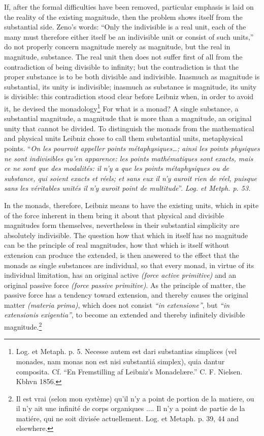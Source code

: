 \documentclass[12pt,a4paper,openany]{book}
\newcommand{\opage}[1]{\marginnote{\footnotesize\textit{[#1]}}}
\begin{document}
\setcounter{footnote}{0}%
\opage{124}If, after the formal difficulties have been
removed, particular emphasis is laid on the reality of the
existing magnitude, then the problem shows itself from the substantial
side. Zeno's words: ``Only the indivisible is a real
unit, each of the many must therefore either itself be
an indivisible unit or consist of such units,''
do not properly concern magnitude merely as magnitude, but the
real in magnitude, substance. The real unit
then does not suffer first of all from the contradiction of being divisible
to infinity; but the contradiction is that the proper substance
is to be both divisible and indivisible. Inasmuch as
magnitude is substantial, its unity is indivisible; inasmuch as
substance is magnitude, its unity is divisible:
this contradiction stood clear before Leibniz when, in order to
avoid it, he devised the monadology\footnote[1]{Log. et Metaph. p. 5. Necesse autem est dari substantias simplices (vel monades, nam monas non est nisi substantiá simplex), quia dantur composita. Cf. ``En Fremstilling af Leibniz's Monadelære.'' C. F. Nielsen. Kbhvn 1856.} For what is
a monad? A single substance, a substantial magnitude,
a magnitude that is more than a magnitude, an original
unity that cannot be divided. To distinguish the monads from
the mathematical and physical units Leibniz chose to
call them substantial units, metaphysical points. ``\textit{On
les pourroit appeller points métaphysiques\dots{}; ainsi les
points physiques ne sont indivisibles qu'en apparence:
les points mathématiques sont exacts, mais ce ne sont
que des modalités: il n'y a que les points métaphysiques
ou de substance, qui soient exacts et réels; et sans eux
il n'y auroit rien de réel, puisque sans les véritables
unités il n'y auroit point de multitude}''. \textit{Log. et Metph.
p. 53.}

In the monads, therefore, Leibniz means to have the existing
units, which in spite of the force inherent in them
\setcounter{footnote}{0}%
\opage{125}bring it about that physical and divisible magnitudes form themselves, nevertheless in
their substantial simplicity are absolutely
indivisible. The question how that which in itself
has no magnitude can be the principle of real magnitudes, how that which is itself without extension can
produce the extended, is then answered to the effect that the monads
as single substances are individual, so that every
monad, in virtue of its individual limitation, has an original
active \textit{(force active primitive)} and an original
passive force \textit{(force passive primitive)}. As the principle of
matter, the passive force has a tendency toward extension,
and thereby causes the original matter \textit{(materia
prima)}, which does not consist \textit{``in extensione''}, but \textit{``in extensionis
exigentia''}, to become an extended and thereby infinitely
divisible magnitude.\footnote[1]{Il est vrai (selon mon système) qu'il n'y a point de portion de la matiere, ou il n'y ait une infinité de corps organiques .... Il n'y a point de partie de la matiére, qui ne soit divisée actuellement. Log. et Metaph. p. 39, 44 and elsewhere.}
\end{document}
